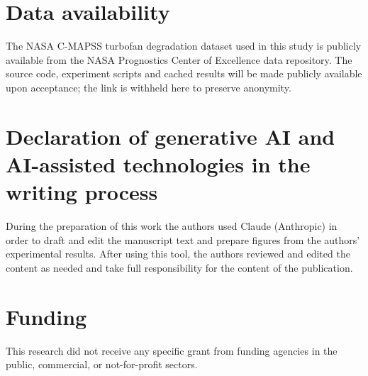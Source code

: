 \documentclass[preprint,12pt,authoryear]{elsarticle}
\begin{document}
\section*{Data availability}
The NASA C-MAPSS turbofan degradation dataset used in this study is publicly available from the NASA Prognostics Center of Excellence data repository. The source code, experiment scripts and cached results will be made publicly available upon acceptance; the link is withheld here to preserve anonymity.

\section*{Declaration of generative AI and AI-assisted technologies in the writing process}
During the preparation of this work the authors used Claude (Anthropic) in order to draft and edit the manuscript text and prepare figures from the authors' experimental results. After using this tool, the authors reviewed and edited the content as needed and take full responsibility for the content of the publication.

\section*{Funding}
This research did not receive any specific grant from funding agencies in the public, commercial, or not-for-profit sectors.



\end{document}
